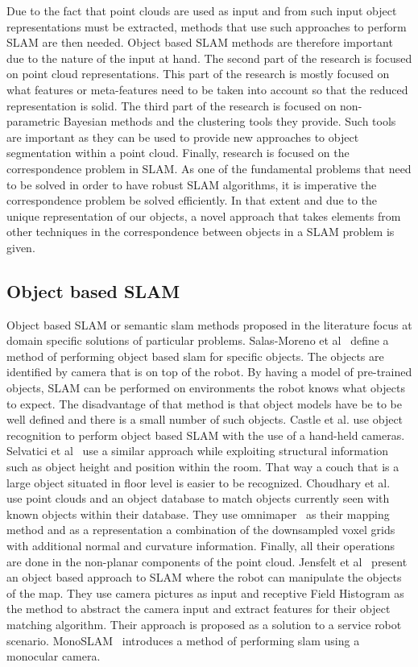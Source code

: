 \documentclass[twoside,hidelinks]{article}
\begin{document}
Due to the fact that point clouds are used as input and from such input object representations must be extracted, methods that use such approaches to perform SLAM are then needed. Object based SLAM methods are therefore important due to the nature of the input at hand. The second part of the research is focused on point cloud representations. This part of the research is mostly focused on what features or meta-features need to be taken into account so that the reduced representation is solid. The third part of the research is focused on non-parametric Bayesian methods and the clustering tools they provide. Such tools are important as they can be used to provide new approaches to object segmentation within a point cloud. Finally, research is focused on the correspondence problem in SLAM. As one of the fundamental problems that need to be solved in order to have robust SLAM algorithms, it is imperative the correspondence problem be solved efficiently. In that extent and due to the unique representation of our objects, a novel approach that takes elements from other techniques in the correspondence between objects in a SLAM problem is given.

\subsection{Object based SLAM}
Object based SLAM or semantic slam methods proposed in the literature focus at domain specific solutions of particular problems. Salas-Moreno et al~\cite{slam++} define a method of performing object based slam for specific objects. The objects are identified by camera that is on top of the robot. By having a model of pre-trained objects, SLAM can be performed on environments the robot knows what objects to expect. The disadvantage of that method is that object models have be to be well defined and there is a small number of such objects. 
Castle et al. use object recognition to perform object based SLAM with the use of a hand-held cameras. Selvatici et al~\cite{objslam} use a similar approach while exploiting structural information such as object height and position within the room. That way a couch that is a large object situated in floor level is easier to be recognized.
Choudhary et al.~\cite{objectpointslam} use point clouds and an object database to match objects currently seen with known objects within their database. They use omnimaper~\cite{omnimaper} as their mapping method and as a representation a combination of the downsampled  voxel grids with additional normal and curvature information.  Finally, all their operations are done in the non-planar components of the point cloud.
Jensfelt et al~\cite{objslam} present an object based approach to SLAM where the robot can manipulate the objects of the map. They use camera pictures as input and receptive Field Histogram as the method to abstract the camera input and extract features for their object matching algorithm. Their approach is proposed as a solution to a service robot scenario.
MonoSLAM~\cite{monoslam} introduces a method of performing slam using a monocular camera. 
\end{document}
